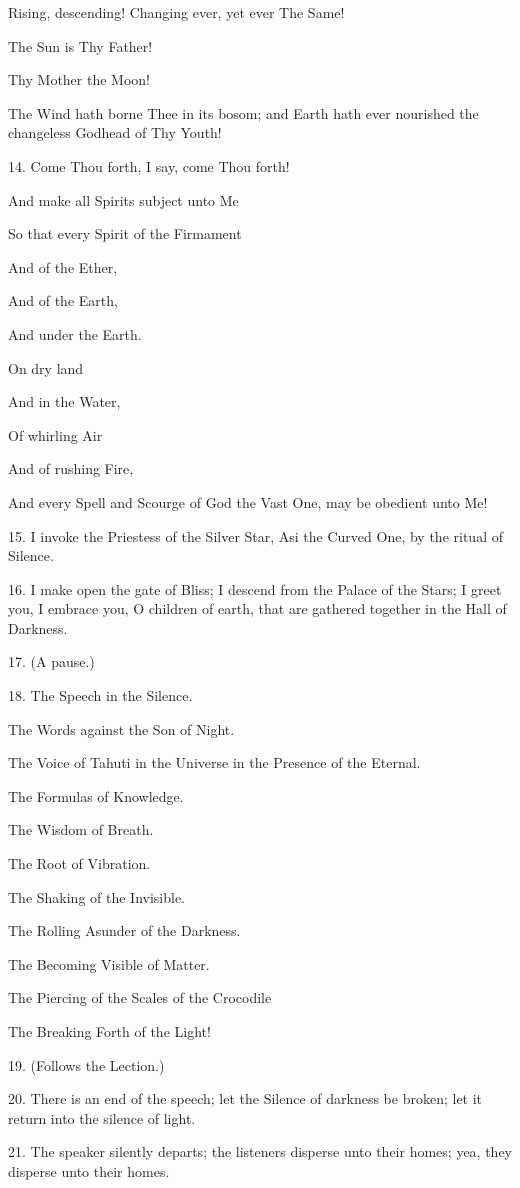 Rising, descending! Changing ever, yet ever The Same!

The Sun is Thy Father!

Thy Mother the Moon!

The Wind hath borne Thee in its bosom; and Earth hath ever nourished the changeless Godhead of Thy Youth!

14. Come Thou forth, I say, come Thou forth!

And make all Spirits subject unto Me

So that every Spirit of the Firmament

And of the Ether,

And of the Earth,

And under the Earth.

On dry land

And in the Water,

Of whirling Air

And of rushing Fire,

And every Spell and Scourge of God the Vast One, may be obedient unto Me!

15. I invoke the Priestess of the Silver Star, Asi the Curved One, by the ritual of Silence.

16. I make open the gate of Bliss; I descend from the Palace of the Stars; I greet you, I embrace you, O children of earth, that are gathered together in the Hall of Darkness.

17. (A pause.)

18. The Speech in the Silence.

The Words against the Son of Night.

The Voice of Tahuti in the Universe in the Presence of the Eternal.

The Formulas of Knowledge.

The Wisdom of Breath.

The Root of Vibration.

The Shaking of the Invisible.

The Rolling Asunder of the Darkness.

The Becoming Visible of Matter.

The Piercing of the Scales of the Crocodile

The Breaking Forth of the Light!

19. (Follows the Lection.)

20. There is an end of the speech; let the Silence of darkness be broken; let it return into the silence of light.

21. The speaker silently departs; the listeners disperse unto their homes; yea, they disperse unto their homes.

